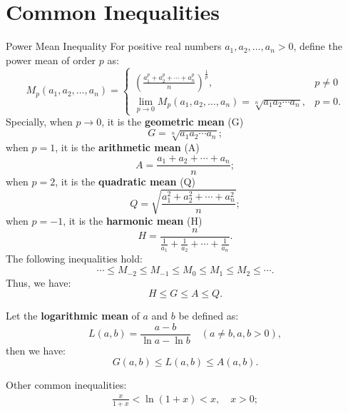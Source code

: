 \documentclass[11pt]{../../TexTemplate/elegantbook}
\begin{document}
\section{Common Inequalities}
\begin{theorem}{Power Mean Inequality}
    For positive real numbers \(a_1, a_2, \dots, a_n > 0\), define the power mean of order \(p\) as:
    \[
    M_{p}(a_1, a_2, \dots, a_n) = 
    \begin{cases} 
        \left( \frac{a_1^p + a_2^p + \cdots + a_n^p}{n} \right)^{\frac{1}{p}}, & p \neq 0 \\ 
        \lim_{p \to 0} M_{p}(a_1, a_2, \dots, a_n) = \sqrt[n]{a_1 a_2 \cdots a_n}, & p = 0 .
    \end{cases}
    \]
    Specially, when \(p \to 0\), it is the \textbf{geometric mean} (G)
    \[
    G = \sqrt[n]{a_1 a_2 \cdots a_n};
    \]
    when \(p = 1\), it is the \textbf{arithmetic mean} (A)
    \[
    A = \frac{a_1 + a_2 + \cdots + a_n}{n};
    \]
    when \(p = 2\), it is the \textbf{quadratic mean} (Q)
    \[
    Q = \sqrt{\frac{a_1^2 + a_2^2 + \cdots + a_n^2}{n}};
    \]
    when \(p = -1\), it is the \textbf{harmonic mean} (H)
    \[
    H = \frac{n}{\frac{1}{a_1} + \frac{1}{a_2} + \cdots + \frac{1}{a_n}}.
    \]
    The following inequalities hold:
    \[
    \cdots \leqslant M_{-2} \leqslant M_{-1} \leqslant M_{0} \leqslant M_{1} \leqslant M_{2} \leqslant \cdots.
    \]
    Thus, we have:
    \[
    H \leqslant G \leqslant A \leqslant Q.
    \]
\end{theorem}
Let the \textbf{logarithmic mean} of \(a\) and \(b\) be defined as:
\[
L(a, b) = \frac{a-b}{\ln a - \ln b} \quad (a \neq b, a, b > 0),
\]
then we have:
\[
G(a, b) \leqslant L(a, b) \leqslant A(a, b).
\]

\vspace{0.7cm}
Other common inequalities:
\begin{gather*}
    \frac{x}{1+x} < \ln(1+x) < x, \quad x > 0; \\
\end{gather*}
\end{document}
